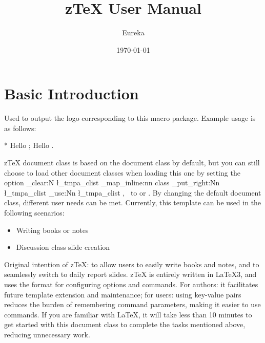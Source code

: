 \documentclass[
  hyper=true,
  class=l3doc, 
  classOption={10pt},
]{../code/ztex}
\title{z\TeX{} User Manual}
\author{Eureka}
\date{\today}
\newcommand{\zkey}[1]{
  \clist_clear:N \l_tmpa_clist
  \clist_map_inline:nn {#1}{
    \clist_put_right:Nn \l_tmpa_clist {\meta{##1}}
  }
  \clist_use:Nn \l_tmpa_clist {,~}
}
\newcounter{DocExample}
\newcommand{\ztex}{{}\lowercase{z}\TeX{}}
\let\Ozthmlang\zthmlang
\let\Ozthmnameset\zthmnameset
\let\Ozthmenvnew\zthmenvnew
\let\Ozthmstyle\zthmstyle
\let\Ozaliasopset\zaliasopset
\let\Ozthmtitleformat\zthmtitleformat
\let\Ozthmtitlebefore\zthmtitlebefore
\let\Ozthmbefore\zthmbefore
\let\Ozthmcolorset\zthmcolorset
\let\Ozthmiconset\zthmiconset
\begin{document}
\let\zthmlang\Ozthmlang
\let\zthmnameset\Ozthmnameset
\let\zthmenvnew\Ozthmenvnew
\let\zthmstyle\Ozthmstyle
\let\zaliasopset\Ozaliasopset
\let\zthmtitleformat\Ozthmtitleformat
\let\zthmtitlebefore\Ozthmtitlebefore
\let\zthmbefore\Ozthmbefore
\let\zthmcolorset\Ozthmcolorset
\let\zthmiconset\Ozthmiconset
{}
\maketitle
\restoregeometry
{}



\section{Basic Introduction}
\begin{function}[updated=2024-11-05]{\zLaTeX}
  \begin{syntax}
  \end{syntax}
  Used to output the logo corresponding to this macro package. Example usage is as follows:
\end{function}
\begin{DocExample}*
  Hello \zTeX{}; Hello \zLaTeX{}.
\end{DocExample}

\ztex{} document class is based on the  document class by default, but you can still choose to load other document classes when loading this one by setting the option \zkey{class} to 
 or . By changing the default document class, different user needs can be met. Currently, this template can be used in the following scenarios:
\begin{itemize}
  \item Writing books or notes
  \item Discussion class slide creation %
\end{itemize}

Original intention of \ztex{}: to allow users to easily write books and notes, and to seamlessly switch to daily report slides. \ztex{} is entirely written in \LaTeX3,
and uses the  format for configuring options and commands. For authors: it facilitates future template extension and maintenance; for users: using key-value pairs reduces the burden of remembering command parameters, making it easier to use commands. If you are familiar with \LaTeX{}, it will take less than 10 minutes to get started with this document class to complete the tasks mentioned above, reducing unnecessary work.
\end{document}
